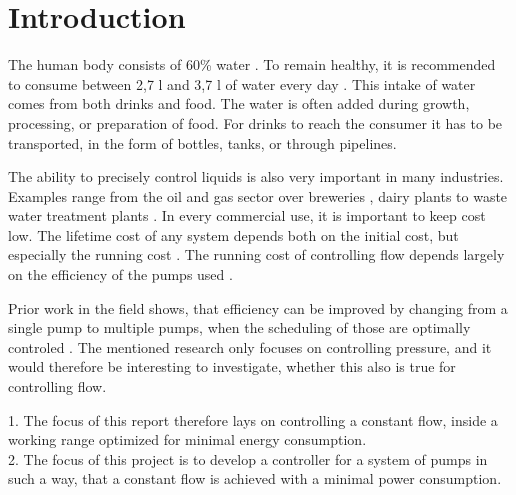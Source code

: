 \chapter{Introduction}\label{ch:introduction}
The human body consists of 60\% water \cite{HumanWater}.
To remain healthy, 
it is recommended to consume between 2,7 l and 3,7 l of water every day \cite{DailyWater}.
This intake of water comes from both drinks and food.
The water is often added during growth, processing, or preparation of food.
For drinks to reach the consumer it has to be transported, 
in the form of bottles, tanks, or through pipelines.

The ability to precisely control liquids is also very important in many industries.
Examples range from the oil and gas sector \cite{OilFlow} over breweries \cite{BrewFlow},
dairy plants \cite{DairyFlow} to waste water treatment plants \cite{WastewaterFlow}.
In every commercial use,
it is important to keep cost low.
The lifetime cost of any system depends both on the initial cost,
but especially the running cost \cite{LifetimeCost}.
The running cost of controlling flow depends largely on the efficiency of the pumps used \cite{Volk2014}.

Prior work in the field shows, 
that efficiency can be improved by changing from a single pump to multiple pumps,
when the scheduling of those are optimally controled \cite{YangMultiPump2008}. 
The mentioned research only focuses on controlling pressure,
and it would therefore be interesting to investigate, 
whether this also is true for controlling flow.


1. The focus of this report therefore lays on controlling a constant flow,
inside a working range optimized for minimal energy consumption.
\\

2. The focus of this project is to develop a controller for a system of pumps in such a way,
that a constant flow is achieved with a minimal power consumption.
\\

